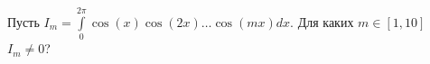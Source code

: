 \documentclass{article}
\begin{document}
Пусть $I_m=\int\limits_0^{2\pi} \cos (x) \cos (2x) \ldots \cos (mx) dx$. Для каких $m \in [1,10]$ $I_m \neq 0$?
\end{document}
